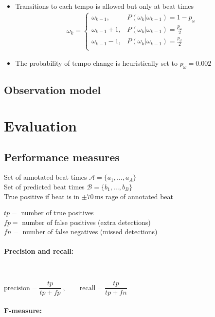 \documentclass{article}
\begin{document}
\begin{itemize}
\item Transitions to each tempo is allowed but only at beat times
\begin{align}
\omega_k = 
\begin{cases}
\omega_{k-1}, & P(\omega_k|\omega_{k-1}) = 1 - p_\omega \\
\omega_{k-1}+1, & P(\omega_k|\omega_{k-1}) = \frac{p_\omega}{2} \\
\omega_{k-1}-1, & P(\omega_k|\omega_{k-1}) = \frac{p_\omega}{2} \\
\end{cases}
\end{align} 
\item The probability of tempo change is heuristically set to $p_\omega = 0.002$
\end{itemize}


\subsection{Observation model}


\section{Evaluation}


\subsection{Performance measures}

Set of annotated beat times $\mathcal A = \{a_1, \dots, a_A\}$ \\
Set of predicted beat times $\mathcal B = \{b_1, \dots, b_B\}$ \\

True positive if beat is in $\pm 70\,\text{ms}$ rage of annotated beat

$tp =$ number of true positives \\
$fp =$ number of false positives (extra detections) \\
$fn =$ number of false negatives (missed detections) 

\paragraph{Precision and recall:} $ $

$\text{precision} = \dfrac{tp}{tp + fp}\;, \qquad \text{recall} = \dfrac{tp}{tp + fn}$


\paragraph{F-measure:} $ $
\end{document}
